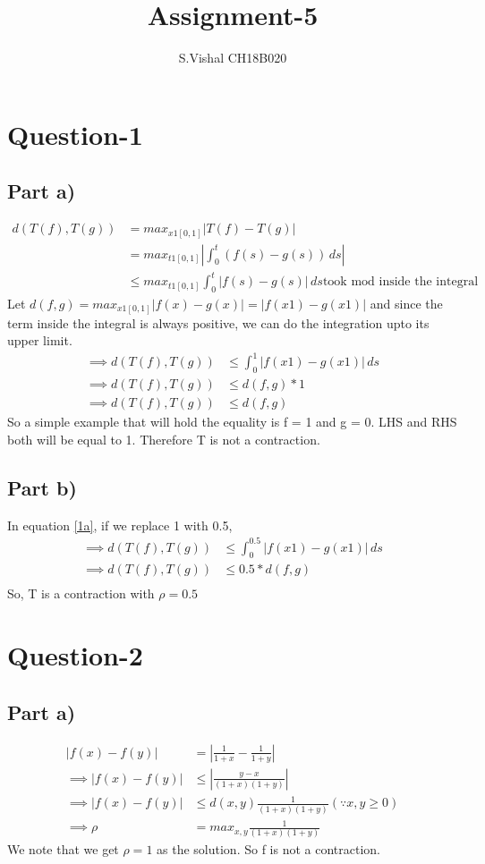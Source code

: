 \documentclass{article}
\title{Assignment-5}
\author{S.Vishal CH18B020}
\begin{document}
\maketitle
\section*{Question-1}
\subsection*{Part a)}
\begin{align}
    d(T(f),T(g)) &= max_{x1[0,1]} |T(f) - T(g)| \\
    &= max_{t1[0,1]} |\int_0^t(f(s) - g(s))\,ds|\\
    &\leq max_{t1[0,1]} \int_0^t|f(s) - g(s)|\,ds  \textrm{took mod inside the integral}
\end{align}
Let $d(f,g) = max_{x1[0,1]} |f(x) - g(x)| = |f(x1) - g(x1)|$ and since the term inside the integral is always positive, we can do the integration upto its upper limit.
\begin{align}
    \implies d(T(f),T(g)) &\leq \int_0^1|f(x1) - g(x1)|\,ds \label{1a}\\
    \implies d(T(f),T(g)) &\leq d(f,g)*1 \\
    \implies d(T(f),T(g)) &\leq d(f,g)
\end{align}
So a simple example that will hold the equality is f = 1 and g = 0. LHS and RHS both will be equal to 1. Therefore T is not a contraction.

\subsection*{Part b)}
In equation \ref{1a}, if we replace 1 with 0.5,
\begin{align}
    \implies d(T(f),T(g)) &\leq \int_0^0.5|f(x1) - g(x1)|\,ds \\
    \implies d(T(f),T(g)) &\leq 0.5*d(f,g) \\
\end{align}
So, T is a contraction with $\rho = 0.5$


\section*{Question-2}
\subsection*{Part a)}
\begin{align}
    |f(x) - f(y)| &= |\frac{1}{1+x} - \frac{1}{1+y}| \\
    \implies |f(x) - f(y)| &\leq |\frac{y-x}{(1+x)(1+y)}| \\
    \implies |f(x) - f(y)| &\leq d(x,y)\frac{1}{(1+x)(1+y)} (\because x,y \geq 0) \\
    \implies \rho &= max_{x,y} \frac{1}{(1+x)(1+y)}
\end{align}
We note that we get $\rho = 1$ as the solution. So f is not a contraction.
\end{document}
